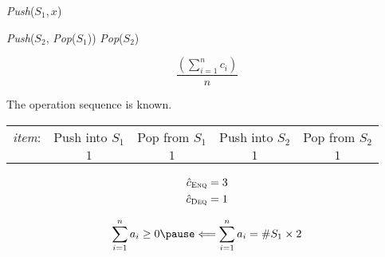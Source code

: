 
\begin{frame}{}
  \centerline{}

  \begin{algorithm}[H]
    \begin{algorithmic}[]
	\State \textsl{Push}($S_1, x$)
      \EndProcedure

      \Statex
            \State \textsl{Push}($S_2$, \textsl{Pop}($S_1$))
          \EndWhile
        \EndIf
        \textsl{Pop}($S_2$)
      \EndProcedure
    \end{algorithmic}
  \end{algorithm}
\end{frame}

\begin{frame}{}
  \centerline{}

  \vspace{0.30cm}
  \[
    \frac{\left(\sum\limits_{i = 1}^{n} c_i\right)}{n}
  \]

  \pause
  \vspace{0.50cm}
  \centerline{The operation sequence is  known.}
\end{frame}

\begin{frame}{}
  \centerline{}

  \begin{table}
    \begin{tabular}{ccccc}
      {\it item}: & Push into $S_1$ & Pop from $S_1$ & Push into $S_2$ & Pop from $S_2$ \\
      & $1$ & $1$ & $1$ & $1$
    \end{tabular}
  \end{table}

  \pause
  \vspace{-0.60cm}
  \begin{align*}
    \hat{c}_{\textsc{Enq}} &= 3 \\
    \hat{c}_{\textsc{Deq}} &= 1 \\
  \end{align*}

  \pause
  \vspace{-0.60cm}
  \[ 
    \sum_{i=1}^{n} a_i \ge 0 \pause \Longleftarrow \sum_{i=1}^{n} a_i = \#S_1 \times 2
  \]
\end{frame}

